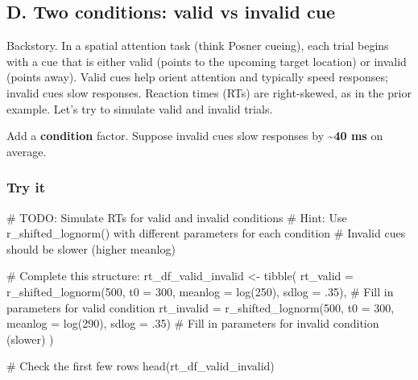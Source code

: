 \documentclass[
  letterpaper,
  DIV=11,
  numbers=noendperiod]{scrartcl}
\newenvironment{Shaded}{\begin{snugshade}}{\end{snugshade}}
\newcommand{\AlertTok}[1]{\textcolor[rgb]{0.68,0.00,0.00}{#1}}
\newcommand{\AttributeTok}[1]{\textcolor[rgb]{0.40,0.45,0.13}{#1}}
\newcommand{\CommentTok}[1]{\textcolor[rgb]{0.37,0.37,0.37}{#1}}
\newcommand{\DecValTok}[1]{\textcolor[rgb]{0.68,0.00,0.00}{#1}}
\newcommand{\FunctionTok}[1]{\textcolor[rgb]{0.28,0.35,0.67}{#1}}
\newcommand{\NormalTok}[1]{\textcolor[rgb]{0.00,0.23,0.31}{#1}}
\newcommand{\OtherTok}[1]{\textcolor[rgb]{0.00,0.23,0.31}{#1}}
\begin{document}
\subsection{D. Two conditions: valid vs invalid
cue}\label{d.-two-conditions-valid-vs-invalid-cue}

Backstory. In a spatial attention task (think Posner cueing), each trial
begins with a cue that is either valid (points to the upcoming target
location) or invalid (points away). Valid cues help orient attention and
typically speed responses; invalid cues slow responses. Reaction times
(RTs) are right-skewed, as in the prior example. Let's try to simulate
valid and invalid trials.

Add a \textbf{condition} factor. Suppose invalid cues slow responses by
\textasciitilde{}\textbf{40 ms} on average.

\subsubsection{Try it}\label{try-it}

\begin{Shaded}
\begin{Highlighting}[]
\CommentTok{\# }\AlertTok{TODO}\CommentTok{: Simulate RTs for valid and invalid conditions}
\CommentTok{\# Hint: Use r\_shifted\_lognorm() with different parameters for each condition}
\CommentTok{\# Invalid cues should be slower (higher meanlog)}

\CommentTok{\# Complete this structure:}
\NormalTok{rt\_df\_valid\_invalid }\OtherTok{\textless{}{-}} \FunctionTok{tibble}\NormalTok{(}
  \AttributeTok{rt\_valid =} \FunctionTok{r\_shifted\_lognorm}\NormalTok{(}\DecValTok{500}\NormalTok{, }\AttributeTok{t0 =} \DecValTok{300}\NormalTok{, }\AttributeTok{meanlog =} \FunctionTok{log}\NormalTok{(}\DecValTok{250}\NormalTok{), }\AttributeTok{sdlog =}\NormalTok{ .}\DecValTok{35}\NormalTok{),     }\CommentTok{\# Fill in parameters for valid condition}
  \AttributeTok{rt\_invalid =} \FunctionTok{r\_shifted\_lognorm}\NormalTok{(}\DecValTok{500}\NormalTok{, }\AttributeTok{t0 =} \DecValTok{300}\NormalTok{, }\AttributeTok{meanlog =} \FunctionTok{log}\NormalTok{(}\DecValTok{290}\NormalTok{), }\AttributeTok{sdlog =}\NormalTok{ .}\DecValTok{35}\NormalTok{)   }\CommentTok{\# Fill in parameters for invalid condition (slower)}
\NormalTok{)}

\CommentTok{\# Check the first few rows}
\FunctionTok{head}\NormalTok{(rt\_df\_valid\_invalid)}
\end{Highlighting}
\end{Shaded}
\end{document}

